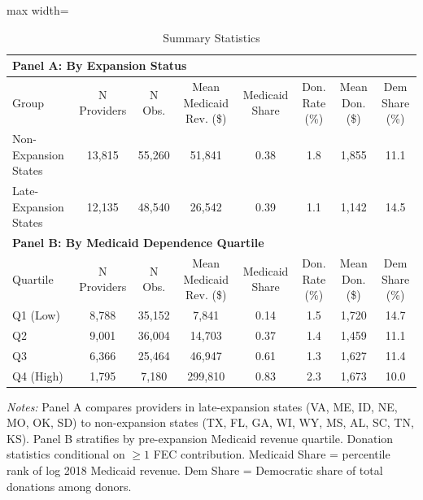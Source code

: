\begin{table}[htbp]
\centering
\caption{Summary Statistics}
\label{tab:summary}
\begin{adjustbox}{max width=\textwidth}
\begin{tabular}{l c c c c c c c }
\toprule
\multicolumn{8}{l}{\textbf{Panel A: By Expansion Status}} \\
\midrule
Group & N Providers & N Obs. & Mean Medicaid Rev. (\$) & Medicaid Share & Don. Rate (\%) & Mean Don. (\$) & Dem Share (\%) \\
\midrule
Non-Expansion States & 13,815 & 55,260 & 51,841 & 0.38 & 1.8 & 1,855 & 11.1 \\
Late-Expansion States & 12,135 & 48,540 & 26,542 & 0.39 & 1.1 & 1,142 & 14.5 \\
\midrule
\multicolumn{8}{l}{\textbf{Panel B: By Medicaid Dependence Quartile}} \\
\midrule
Quartile & N Providers & N Obs. & Mean Medicaid Rev. (\$) & Medicaid Share & Don. Rate (\%) & Mean Don. (\$) & Dem Share (\%) \\
\midrule
Q1 (Low) & 8,788 & 35,152 & 7,841 & 0.14 & 1.5 & 1,720 & 14.7 \\
Q2 & 9,001 & 36,004 & 14,703 & 0.37 & 1.4 & 1,459 & 11.1 \\
Q3 & 6,366 & 25,464 & 46,947 & 0.61 & 1.3 & 1,627 & 11.4 \\
Q4 (High) & 1,795 & 7,180 & 299,810 & 0.83 & 2.3 & 1,673 & 10.0 \\
\bottomrule
\end{tabular}
\end{adjustbox}
\par\smallskip\small\textit{Notes:} Panel A compares providers in late-expansion states (VA, ME, ID, NE, MO, OK, SD) to non-expansion states (TX, FL, GA, WI, WY, MS, AL, SC, TN, KS). Panel B stratifies by pre-expansion Medicaid revenue quartile. Donation statistics conditional on $\geq 1$ FEC contribution. Medicaid Share = percentile rank of log 2018 Medicaid revenue. Dem Share = Democratic share of total donations among donors.
\end{table}
